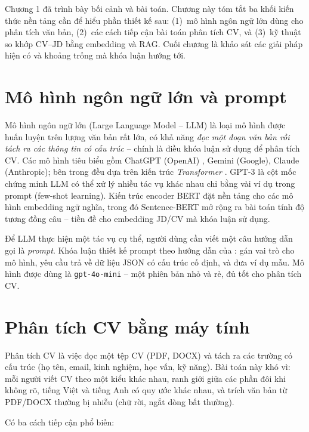 \documentclass[../DoAn.tex]{subfiles}
\begin{document}
Chương 1 đã trình bày bối cảnh và bài toán. Chương này tóm tắt ba khối kiến thức nền tảng cần để hiểu phần thiết kế sau: (1)~mô hình ngôn ngữ lớn dùng cho phân tích văn bản, (2)~các cách tiếp cận bài toán phân tích CV, và (3)~kỹ thuật so khớp CV--JD bằng embedding và RAG. Cuối chương là khảo sát các giải pháp hiện có và khoảng trống mà khóa luận hướng tới.

\section{Mô hình ngôn ngữ lớn và prompt}
\label{sec:llm}

Mô hình ngôn ngữ lớn (Large Language Model -- LLM) là loại mô hình được huấn luyện trên lượng văn bản rất lớn, có khả năng \textit{đọc một đoạn văn bản rồi tách ra các thông tin có cấu trúc} -- chính là điều khóa luận sử dụng để phân tích CV. Các mô hình tiêu biểu gồm ChatGPT (OpenAI) \cite{openai2023gpt4}, Gemini (Google), Claude (Anthropic); bên trong đều dựa trên kiến trúc \textit{Transformer} \cite{vaswani2017attention}. GPT-3 \cite{brown2020gpt3} là cột mốc chứng minh LLM có thể xử lý nhiều tác vụ khác nhau chỉ bằng vài ví dụ trong prompt (few-shot learning). Kiến trúc encoder BERT \cite{devlin2019bert} đặt nền tảng cho các mô hình embedding ngữ nghĩa, trong đó Sentence-BERT \cite{reimers2019sbert} mở rộng ra bài toán tính độ tương đồng câu -- tiền đề cho embedding JD/CV mà khóa luận sử dụng.

Để LLM thực hiện một tác vụ cụ thể, người dùng cần viết một câu hướng dẫn gọi là \textit{prompt}. Khóa luận thiết kế prompt theo hướng dẫn của \cite{white2023prompt}: gán vai trò cho mô hình, yêu cầu trả về dữ liệu JSON có cấu trúc cố định, và đưa ví dụ mẫu. Mô hình được dùng là \texttt{gpt-4o-mini} -- một phiên bản nhỏ và rẻ, đủ tốt cho phân tích CV.

\section{Phân tích CV bằng máy tính}

Phân tích CV là việc đọc một tệp CV (PDF, DOCX) và tách ra các trường có cấu trúc (họ tên, email, kinh nghiệm, học vấn, kỹ năng). Bài toán này khó vì: mỗi người viết CV theo một kiểu khác nhau, ranh giới giữa các phần đôi khi không rõ, tiếng Việt và tiếng Anh có quy ước khác nhau, và trích văn bản từ PDF/DOCX thường bị nhiễu (chữ rời, ngắt dòng bất thường).

Có ba cách tiếp cận phổ biến:
\end{document}

